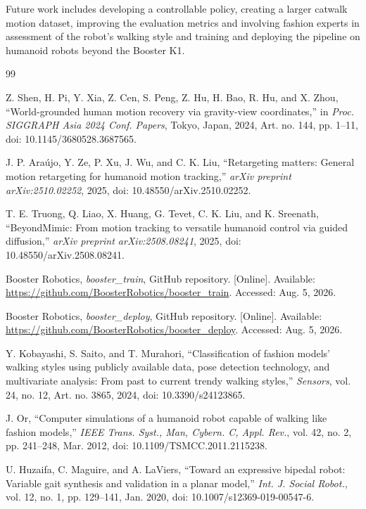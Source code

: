 \documentclass[letterpaper, 10 pt, conference]{ieeeconf}  %
\begin{document}
Future work includes developing a controllable policy, creating a larger catwalk motion dataset, improving the evaluation metrics and involving fashion experts in assessment of the robot's walking style and training and deploying the pipeline on humanoid robots beyond the Booster K1.



\begin{thebibliography}{99}

 Z. Shen, H. Pi, Y. Xia, Z. Cen, S. Peng, Z. Hu, H. Bao, R. Hu, and X. Zhou, ``World-grounded human motion recovery via gravity-view coordinates,'' in \emph{Proc. SIGGRAPH Asia 2024 Conf. Papers}, Tokyo, Japan, 2024, Art. no. 144, pp. 1--11, doi: 10.1145/3680528.3687565.

 J. P. Ara\'{u}jo, Y. Ze, P. Xu, J. Wu, and C. K. Liu, ``Retargeting matters: General motion retargeting for humanoid motion tracking,'' \emph{arXiv preprint arXiv:2510.02252}, 2025, doi: 10.48550/arXiv.2510.02252.

 T. E. Truong, Q. Liao, X. Huang, G. Tevet, C. K. Liu, and K. Sreenath, ``BeyondMimic: From motion tracking to versatile humanoid control via guided diffusion,'' \emph{arXiv preprint arXiv:2508.08241}, 2025, doi: 10.48550/arXiv.2508.08241.

 Booster Robotics, \emph{booster\_train}, GitHub repository. [Online]. Available: \url{https://github.com/BoosterRobotics/booster_train}. Accessed: Aug. 5, 2026.

 Booster Robotics, \emph{booster\_deploy}, GitHub repository. [Online]. Available: \url{https://github.com/BoosterRobotics/booster_deploy}. Accessed: Aug. 5, 2026.

 Y. Kobayashi, S. Saito, and T. Murahori, ``Classification of fashion models' walking styles using publicly available data, pose detection technology, and multivariate analysis: From past to current trendy walking styles,'' \emph{Sensors}, vol. 24, no. 12, Art. no. 3865, 2024, doi: 10.3390/s24123865.

 J. Or, ``Computer simulations of a humanoid robot capable of walking like fashion models,'' \emph{IEEE Trans. Syst., Man, Cybern. C, Appl. Rev.}, vol. 42, no. 2, pp. 241--248, Mar. 2012, doi: 10.1109/TSMCC.2011.2115238.

 U. Huzaifa, C. Maguire, and A. LaViers, ``Toward an expressive bipedal robot: Variable gait synthesis and validation in a planar model,'' \emph{Int. J. Social Robot.}, vol. 12, no. 1, pp. 129--141, Jan. 2020, doi: 10.1007/s12369-019-00547-6.

\end{thebibliography}
\end{document}
